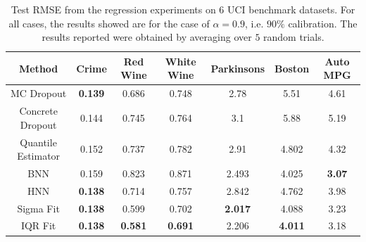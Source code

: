 \documentclass[letterpaper]{article} %
\begin{document}
\begin{table}[t]
	\centering
	\caption{Test RMSE from the regression experiments on $6$ UCI benchmark datasets. For all cases, the results showed are for the case of $\alpha = 0.9$, i.e. $90\%$ calibration. The results reported were obtained by averaging over $5$ random trials.}

	\begin{tabular}{|c|c|c|c|c|c|c|}
		\hline
		\rule{0pt}{2ex} 
		\textbf{Method} & \cellcolor{gray!5}\textbf{Crime} & \cellcolor{gray!10}\textbf{Red Wine} & \cellcolor{gray!15}\textbf{White Wine} & \cellcolor{gray!20}\textbf{Parkinsons} & \cellcolor{gray!25}\textbf{Boston} & \cellcolor{gray!30}\textbf{Auto MPG} \\ \hline \hline
        \rule{0pt}{2ex}   
		MC Dropout & \cellcolor{gray!5}\textbf{0.139} & \cellcolor{gray!10}0.686 & \cellcolor{gray!15}0.748 &  \cellcolor{gray!20}2.78 & \cellcolor{gray!25}5.51 & \cellcolor{gray!30}4.61 \\
        \rule{0pt}{2ex}   
		Concrete Dropout & \cellcolor{gray!5}0.144 & \cellcolor{gray!10}0.745 & \cellcolor{gray!15}0.764 &  \cellcolor{gray!20}3.1 &\cellcolor{gray!25} 5.88 & \cellcolor{gray!30}5.19 \\
        \rule{0pt}{2ex} 
		Quantile Estimator & \cellcolor{gray!5}0.152 & \cellcolor{gray!10}0.737 & \cellcolor{gray!15}0.782 &  \cellcolor{gray!20}2.91 &\cellcolor{gray!25} 4.802 & \cellcolor{gray!30}4.32\\
        \rule{0pt}{2ex} 
		BNN & \cellcolor{gray!5}0.159 & \cellcolor{gray!10}0.823 & \cellcolor{gray!15}0.871 &  \cellcolor{gray!20}2.493 & \cellcolor{gray!25}4.025 & \cellcolor{gray!30}\textbf{3.07} \\
        \rule{0pt}{2ex} 
		HNN & \cellcolor{gray!5}\textbf{0.138} & \cellcolor{gray!10}0.714 & \cellcolor{gray!15}0.757 &  \cellcolor{gray!20}2.842 & \cellcolor{gray!25}4.762 & \cellcolor{gray!30}3.98 \rule{0pt}{2ex}  \\
		\hline
		\hline
		Sigma Fit & \cellcolor{gray!5}\textbf{0.138} & \cellcolor{gray!10}0.599 & \cellcolor{gray!15}0.702 &  \cellcolor{gray!20}\textbf{2.017} & \cellcolor{gray!25}4.088 & \cellcolor{gray!30}3.23 \\
        \rule{0pt}{2ex} 
		IQR Fit & \cellcolor{gray!5}\textbf{0.138} & \cellcolor{gray!10}\textbf{0.581} & \cellcolor{gray!15}\textbf{0.691} &  \cellcolor{gray!20}2.206 &\cellcolor{gray!25} \textbf{4.011} & \cellcolor{gray!30}3.18\\

		\hline
	\end{tabular}
	\label{table:regression exp}
\end{table}
\end{document}

